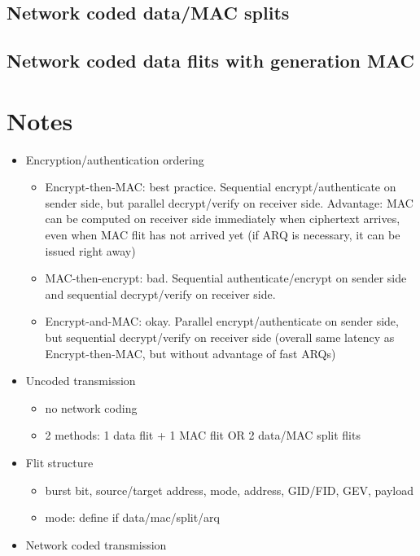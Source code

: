 \subsection{Network coded data/MAC splits}
\subsection{Network coded data flits with generation MAC}

\section{Notes}
\begin{itemize}
    \item Encryption/authentication ordering
        \begin{itemize}
            \item Encrypt-then-MAC: best practice. Sequential encrypt/authenticate on sender side, but parallel decrypt/verify
                on receiver side. Advantage: MAC can be computed on receiver side immediately when ciphertext arrives, even when
                MAC flit has not arrived yet (if ARQ is necessary, it can be issued right away)
            \item MAC-then-encrypt: bad. Sequential authenticate/encrypt on sender side and sequential decrypt/verify on receiver
                side.
            \item Encrypt-and-MAC: okay. Parallel encrypt/authenticate on sender side, but sequential decrypt/verify on receiver
                side (overall same latency as Encrypt-then-MAC, but without advantage of fast ARQs)
        \end{itemize}
    \item Uncoded transmission
        \begin{itemize}
            \item no network coding
            \item 2 methods: 1 data flit + 1 MAC flit OR 2 data/MAC split flits
        \end{itemize}
    \item Flit structure
        \begin{itemize}
            \item burst bit, source/target address, mode, address, GID/FID, GEV, payload
            \item mode: define if data/mac/split/arq
        \end{itemize}
    \item Network coded transmission

\end{itemize}
